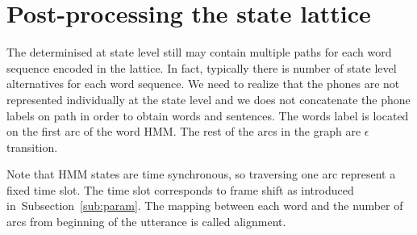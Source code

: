 % 
% 

\section{Post-processing the state lattice}
\label{sec:postprocess}
The \/ determinised at state level still may contain
multiple paths for each word sequence encoded in the lattice.
In fact, typically there is number of state level alternatives for each word sequence.
We need to realize that the phones are not represented individually at the state level
and we does not concatenate the phone labels on path in order to obtain words and sentences.
The words label is located on the first arc of the word \ac{HMM}. 
The rest of the arcs in the graph are $\epsilon$ transition.

Note that \ac{HMM} states are time synchronous, so traversing one arc represent a fixed time slot.
The time slot corresponds to frame shift as introduced in~Subsection~\ref{sub:param}.
The mapping between each word and the number of arcs from beginning of the utterance is called
alignment.

